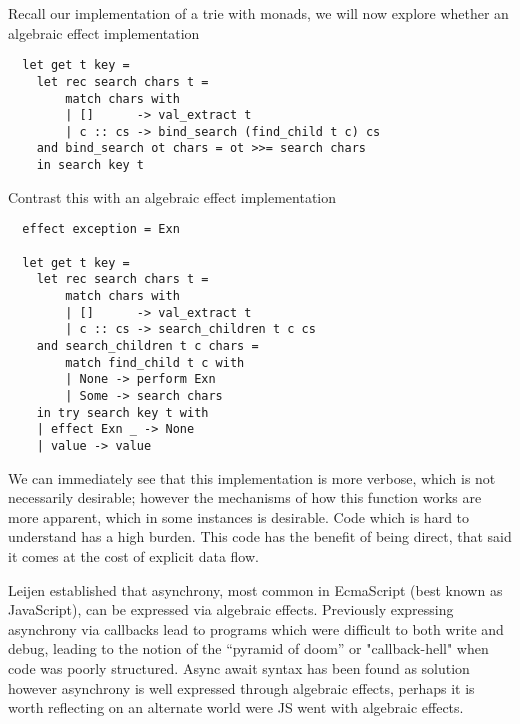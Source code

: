 Recall our implementation of a trie with monads,
we will now explore whether an algebraic effect implementation
\begin{verbatim}
  let get t key =
    let rec search chars t =
        match chars with
        | []      -> val_extract t
        | c :: cs -> bind_search (find_child t c) cs
    and bind_search ot chars = ot >>= search chars
    in search key t
\end{verbatim}

Contrast this with an algebraic effect implementation
\begin{verbatim}
  effect exception = Exn

  let get t key =
    let rec search chars t =
        match chars with
        | []      -> val_extract t
        | c :: cs -> search_children t c cs
    and search_children t c chars =
        match find_child t c with
        | None -> perform Exn
        | Some -> search chars
    in try search key t with
    | effect Exn _ -> None
    | value -> value
\end{verbatim}

We can immediately see that this implementation is more verbose,
which is not necessarily desirable;
however the mechanisms of how this function works
are more apparent, which in some instances is desirable.
Code which is hard to understand has a high burden.
This code has the benefit of being direct, that said
it comes at the cost of explicit data flow.

Leijen\cite{leijen2017structured} established that
asynchrony, most common in EcmaScript (best known as JavaScript),
can be expressed via algebraic effects.
Previously expressing asynchrony via callbacks
lead to programs which were difficult to both write and debug,
leading to the notion of the “pyramid of doom” or
"callback-hell" when code was poorly structured.
Async await syntax has been found as solution
however asynchrony is well expressed through algebraic effects,
perhaps it is worth reflecting on an alternate world
were JS went with algebraic effects.


